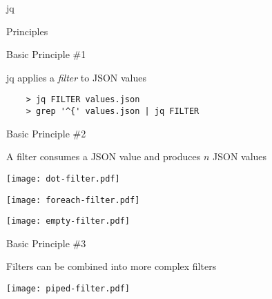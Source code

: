 \documentclass{beamer}
\renewcommand\big[1]{
  \begin{center}
    \Large{#1}
  \end{center}
}
\begin{document}
\begin{frame}
  \centering\Huge{jq}
\end{frame}

\begin{frame}
  \centering\Huge{Principles}
\end{frame}

\begin{frame}[fragile]
  \big{Basic Principle \#1}

  \begin{center}
    jq applies a \textit{filter} to JSON values
  \end{center}

  \begin{lstlisting}
    > jq FILTER values.json
    > grep '^{' values.json | jq FILTER
  \end{lstlisting}
\end{frame}

\begin{frame}
  \big{Basic Principle \#2}

  \begin{center}
    A filter consumes a JSON value and produces $n$ JSON values
  \end{center}

  \begin{center}
    \begin{minipage}{.3\textwidth}
      \texttt{[image: dot-filter.pdf]}
    \end{minipage}
    \begin{minipage}{.3\textwidth}
      \texttt{[image: foreach-filter.pdf]}
    \end{minipage}
    \begin{minipage}{.3\textwidth}
      \texttt{[image: empty-filter.pdf]}
    \end{minipage}
  \end{center}
\end{frame}

\begin{frame}[fragile]
  \big{Basic Principle \#3}

  \begin{center}
    Filters can be combined into more complex filters
  \end{center}

  \begin{center}
    \texttt{[image: piped-filter.pdf]}
  \end{center}
\end{frame}
\end{document}
